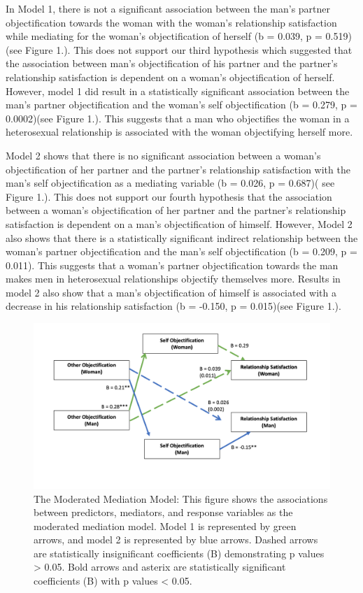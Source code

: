 \documentclass[
  english,
  man,floatsintext]{apa6}
\begin{document}
In Model 1, there is not a significant association between the man's partner objectification towards the woman with the woman's relationship satisfaction while mediating for the woman's objectification of herself (b = 0.039, p = 0.519)(see Figure 1.). This does not support our third hypothesis which suggested that the association between man's objectification of his partner and the partner's relationship satisfaction is dependent on a woman's objectification of herself. However, model 1 did result in a statistically significant association between the man's partner objectification and the woman's self objectification (b = 0.279, p = 0.0002)(see Figure 1.). This suggests that a man who objectifies the woman in a heterosexual relationship is associated with the woman objectifying herself more.

Model 2 shows that there is no significant association between a woman's objectification of her partner and the partner's relationship satisfaction with the man's self objectification as a mediating variable (b = 0.026, p = 0.687)( see Figure 1.). This does not support our fourth hypothesis that the association between a woman's objectification of her partner and the partner's relationship satisfaction is dependent on a man's objectification of himself. However, Model 2 also shows that there is a statistically significant indirect relationship between the woman's partner objectification and the man's self objectification (b = 0.209, p = 0.011). This suggests that a woman's partner objectification towards the man makes men in heterosexual relationships objectify themselves more. Results in model 2 also show that a man's objectification of himself is associated with a decrease in his relationship satisfaction (b = -0.150, p = 0.015)(see Figure 1.).

\begin{figure}
\centering
\includegraphics{Images/hypothesis_model_results.png}
\caption{The Moderated Mediation Model: This figure shows the associations between predictors, mediators, and response variables as the moderated mediation model. Model 1 is represented by green arrows, and model 2 is represented by blue arrows. Dashed arrows are statistically insignificant coefficients (B) demonstrating p values \textgreater{} 0.05. Bold arrows and asterix are statistically significant coefficients (B) with p values \textless{} 0.05.}
\end{figure}
\end{document}
